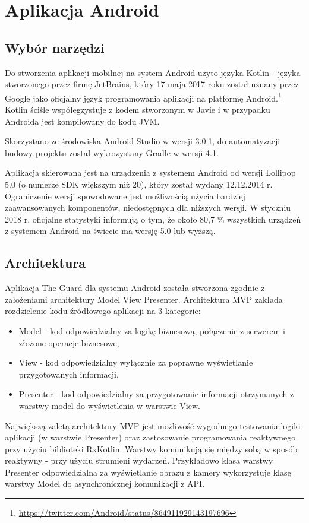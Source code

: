 \section{Aplikacja Android}
\subsection{Wybór narzędzi}
Do stworzenia aplikacji mobilnej na system Android użyto języka Kotlin - języka stworzonego przez firmę JetBrains, który 17 maja 2017 roku został uznany przez Google jako oficjalny język programowania aplikacji na platformę Android.\footnote{\url{https://twitter.com/Android/status/864911929143197696}}
Kotlin ściśle współegzystuje z kodem stworzonym w Javie i w przypadku Androida jest kompilowany do kodu JVM.

Skorzystano ze środowiska Android Studio w wersji 3.0.1, do automatyzacji budowy projektu został wykrozystany Gradle w wersji 4.1.

Aplikacja skierowana jest na urządzenia z systemem Android od wersji Lollipop 5.0 (o numerze SDK większym niż 20), który został wydany 12.12.2014 r. Ograniczenie wersji spowodowane jest możliwością użycia bardziej zaawansowanych komponentów, niedostępnych dla niższych wersji. W styczniu 2018 r. oficjalne statystyki informują o tym, że około 80,7 \% wszystkich urządzeń z systemem Android na świecie ma wersję 5.0 lub wyższą.

\subsection{Architektura}
Aplikacja The Guard dla systemu Android została stworzona zgodnie z założeniami architektury Model View Presenter.
Architektura MVP zakłada rozdzielenie kodu źródłowego aplikacji na 3 kategorie:
\begin{itemize}
\item Model - kod odpowiedzialny za logikę biznesową, połączenie z serwerem i złożone operacje biznesowe,
\item View - kod odpowiedzialny wyłącznie za poprawne wyświetlanie przygotowanych informacji,
\item Presenter - kod odpowiedzialny za przygotowanie informacji otrzymanych z warstwy model do wyświetlenia w warstwie View.
\end{itemize}
Największą zaletą architektury MVP jest możliwość wygodnego testowania logiki aplikacji (w warstwie Presenter) oraz zastosowanie programowania reaktywnego przy użyciu biblioteki RxKotlin.
Warstwy komunikują się między sobą w sposób reaktywny - przy użyciu strumieni wydarzeń. Przykładowo klasa warstwy Presenter odpowiedzialna za wyświetlanie obrazu z kamery wykorzystuje klasę warstwy Model do asynchronicznej komunikacji z API.

